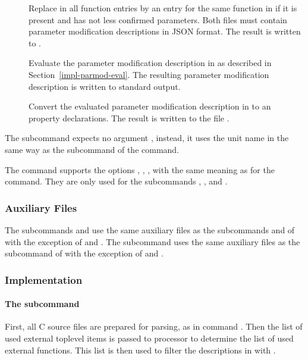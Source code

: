 \begin{description}
\item[] Replace in  all function entries by an entry for the same function in 
if it is present and has not less confirmed parameters. Both files must contain 
parameter modification descriptions in JSON format. The result is written to .

\item[] Evaluate the parameter modification description in  as described in 
Section~\ref{impl-parmod-eval}.  The resulting parameter modification description is written to standard output.

\item[] Convert the evaluated parameter modification description in  to an property declarations.
The result is written to the file .

\end{description}

The subcommand  expects no argument , instead, it uses the unit name in the same way as the subcommand  
of the  command.

The  command supports the options , , ,  with the same meaning as
for the  command. They are only used for the subcommands , , and .

\subsubsection{Auxiliary Files}

The subcommands  and  use the same auxiliary files as the subcommands  and  of  with 
the exception of  and .
The subcommand  uses the same auxiliary files as the subcommand  of  with the exception
of  and .

\subsubsection{Implementation}

\paragraph{The subcommand } 
First, all C source files are prepared for parsing, as in command . Then the list of used external toplevel 
items  is passed to processor  to determine the list of 
used external functions. This list is then used to filter the descriptions in  with .


